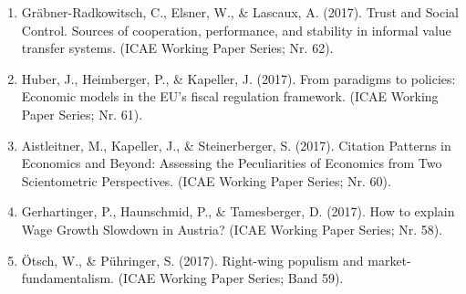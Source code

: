 \begin{enumerate}
	 \item Gräbner-Radkowitsch, C., Elsner, W., \& Lascaux, A. (2017). Trust and Social Control. Sources of cooperation, performance, and stability in informal value transfer systems. (ICAE Working Paper Series; Nr. 62).
	 \item Huber, J., Heimberger, P., \& Kapeller, J. (2017). From paradigms to policies: Economic models in the EU’s fiscal regulation framework. (ICAE Working Paper Series; Nr. 61).
	 \item Aistleitner, M., Kapeller, J., \& Steinerberger, S. (2017). Citation Patterns in Economics and Beyond: Assessing the Peculiarities of Economics from Two Scientometric Perspectives. (ICAE Working Paper Series; Nr. 60).
	 \item Gerhartinger, P., Haunschmid, P., \& Tamesberger, D. (2017). How to explain Wage Growth Slowdown in Austria? (ICAE Working Paper Series; Nr. 58).
	 \item Ötsch, W., \& Pühringer, S. (2017). Right-wing populism and market-fundamentalism. (ICAE Working Paper Series; Band 59).
\end{enumerate}
